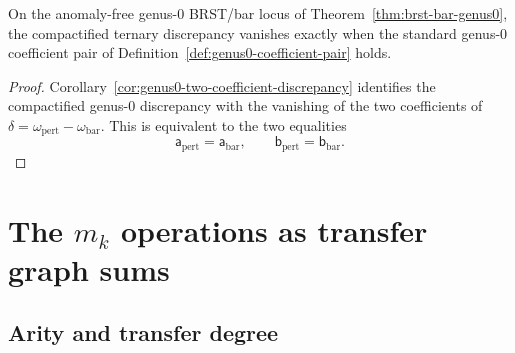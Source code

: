 \begin{corollary}
\label{cor:genus0-named-coefficient-discrepancy}
On the anomaly-free genus-$0$ BRST/bar locus of
Theorem~\ref{thm:brst-bar-genus0}, the compactified ternary discrepancy
vanishes exactly when the standard genus-$0$ coefficient pair of
Definition~\ref{def:genus0-coefficient-pair} holds.
\end{corollary}

\begin{proof}
Corollary~\ref{cor:genus0-two-coefficient-discrepancy} identifies the
compactified genus-$0$ discrepancy with the vanishing of the two
coefficients of
\(\delta=\omega_{\mathrm{pert}}-\omega_{\mathrm{bar}}\).
This is equivalent to the two equalities
\[
\mathsf{a}_{\mathrm{pert}}=\mathsf{a}_{\mathrm{bar}},
\qquad
\mathsf{b}_{\mathrm{pert}}=\mathsf{b}_{\mathrm{bar}}.
\]
\end{proof}

\section{\texorpdfstring{The $m_k$ operations as transfer graph sums}{The m k operations as transfer graph sums}}
\label{sec:mk-feynman-complete}

\subsection{\texorpdfstring{Arity and transfer degree}{Arity and transfer degree}}

